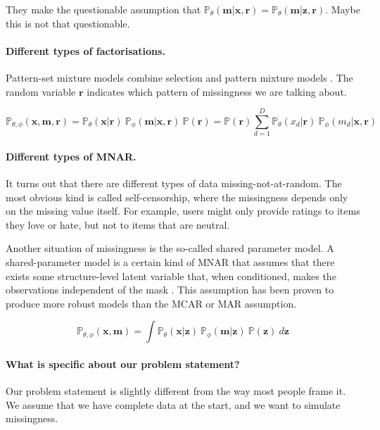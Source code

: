 \documentclass[a4paper,12pt,twoside,openright]{report}
\begin{document}
They make the questionable assumption that $\mathbb{P}_\theta (\mathbf{m} | \mathbf{x}, \mathbf{r}) = \mathbb{P}_\theta (\mathbf{m} | \mathbf{z}, \mathbf{r})$. Maybe this is not that questionable.

\paragraph{Different types of factorisations.} Pattern-set mixture models combine selection and pattern mixture models \parencite{littleStatisticalAnalysisMissing2002}. The random variable $\mathbf{r}$ indicates which pattern of missingness we are talking about.

\begin{equation*}
    \mathbb{P}_{\theta, \phi} (\mathbf{x}, \mathbf{m}, \mathbf{r}) = \mathbb{P}_{\theta} (\mathbf{x} | \mathbf{r}) ~ \mathbb{P}_{\phi} (\mathbf{m} | \mathbf{x}, \mathbf{r}) ~ \mathbb{P} (\mathbf{r}) = \mathbb{P} (\mathbf{r}) \sum_{d=1}^D \mathbb{P}_{\theta} (x_d | \mathbf{r}) ~ \mathbb{P}_{\phi} (m_d | \mathbf{x}, \mathbf{r})
\end{equation*}

\paragraph{Different types of MNAR.} It turns out that there are different types of data missing-not-at-random. The most obvious kind is called self-censorship, where the missingness depends only on the missing value itself. For example, users might only provide ratings to items they love or hate, but not to items that are neutral.

Another situation of missingness is the so-called shared parameter model. A shared-parameter model is a certain kind of MNAR that assumes that there exists some structure-level latent variable that, when conditioned, makes the observations independent of the mask \parencite{wuEstimationComparisonChanges1988}. This assumption has been proven to produce more robust models than the MCAR or MAR assumption.

\begin{equation*}
    \mathbb{P}_{\theta, \phi} (\mathbf{x}, \mathbf{m}) = \int \mathbb{P}_{\theta} (\mathbf{x} | \mathbf{z}) ~ \mathbb{P}_{\phi} (\mathbf{m} | \mathbf{z}) ~ \mathbb{P} (\mathbf{z}) ~ d\mathbf{z}
\end{equation*}

\paragraph{What is specific about our problem statement?} Our problem statement is slightly different from the way most people frame it. We assume that we have complete data at the start, and we want to simulate missingness.
\end{document}
